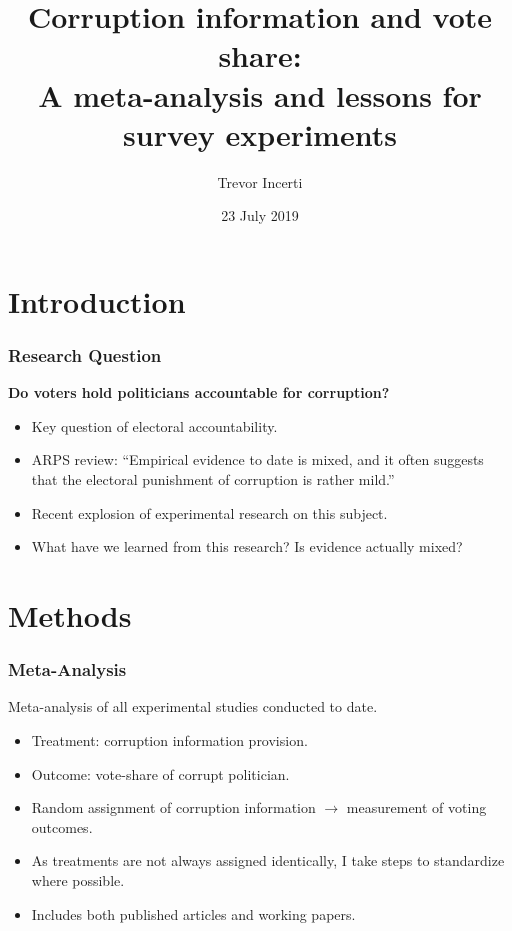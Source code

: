 \documentclass[usenames,dvipsnames]{beamer}
\title{Corruption information and vote share: \\ A meta-analysis and lessons for survey
experiments}
\date{23 July 2019}
\author{Trevor Incerti}
\institute{Yale University}
\begin{document}
\maketitle


\section{Introduction}

\begin{frame}
\frametitle{Research Question}
\textbf{Do voters hold politicians accountable for corruption?}
\pause
\begin{itemize}
\item Key question of \textcolor{Cerulean}{electoral accountability}. 
\pause
\item ARPS review: ``Empirical evidence to date is \textcolor{Cerulean}{mixed}, and it often suggests that the electoral punishment of corruption is rather mild.'' \citep{de2017electoral} 
\pause
\item Recent explosion of experimental research on this subject. 
\pause
\item What have we learned from this research? Is evidence actually mixed?
\end{itemize}
\end{frame}


\section{Methods}

\begin{frame}[label = methods]
\frametitle{Meta-Analysis}
Meta-analysis of all \textcolor{Cerulean}{experimental} studies conducted to date. 
\pause
\begin{itemize}
\item \textcolor{Cerulean}{Treatment}: corruption information provision. 
\pause
\item \textcolor{Cerulean}{Outcome}: vote-share of corrupt politician.
\pause
\item Random assignment of corruption information $\rightarrow$ measurement of voting outcomes.
\pause
\item As treatments are not always assigned identically, I take steps to standardize where possible. \hyperlink{details}{}
\pause
\item Includes both \textcolor{Cerulean}{published articles and working papers}.
\end{itemize}
\end{frame}
\end{document}

